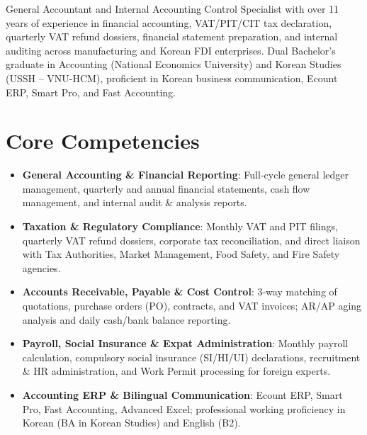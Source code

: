 \documentclass[11pt,a4paper,sans]{moderncv}
\begin{document}
\makecvtitle


\vspace{6pt}
\small{General Accountant and Internal Accounting Control Specialist with over 11 years of experience in financial accounting, VAT/PIT/CIT tax declaration, quarterly VAT refund dossiers, financial statement preparation, and internal auditing across manufacturing and Korean FDI enterprises. Dual Bachelor's graduate in Accounting (National Economics University) and Korean Studies (USSH -- VNU-HCM), proficient in Korean business communication, Ecount ERP, Smart Pro, and Fast Accounting.}


\section{Core Competencies}
\vspace{1pt}
\begin{itemize}

\item \textbf{General Accounting \& Financial Reporting}: Full-cycle general ledger management, quarterly and annual financial statements, cash flow management, and internal audit \& analysis reports.

\item \textbf{Taxation \& Regulatory Compliance}: Monthly VAT and PIT filings, quarterly VAT refund dossiers, corporate tax reconciliation, and direct liaison with Tax Authorities, Market Management, Food Safety, and Fire Safety agencies.

\item \textbf{Accounts Receivable, Payable \& Cost Control}: 3-way matching of quotations, purchase orders (PO), contracts, and VAT invoices; AR/AP aging analysis and daily cash/bank balance reporting.

\item \textbf{Payroll, Social Insurance \& Expat Administration}: Monthly payroll calculation, compulsory social insurance (SI/HI/UI) declarations, recruitment \& HR administration, and Work Permit processing for foreign experts.

\item \textbf{Accounting ERP \& Bilingual Communication}: Ecount ERP, Smart Pro, Fast Accounting, Advanced Excel; professional working proficiency in Korean (BA in Korean Studies) and English (B2).

\end{itemize}
\end{document}
